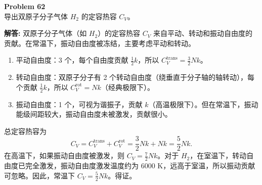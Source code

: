 \documentclass[12pt, a4paper, oneside]{ctexart}
\newenvironment{solution}{\par\noindent\textbf{解答:}\quad}{\par}
\begin{document}
\begin{mdframed}[backgroundcolor=gray!10, linewidth=0pt]
    \textbf{Problem 62} \\
    导出双原子分子气体 $H_2$ 的定容热容 $C_V$。
\end{mdframed}
\begin{solution}
    双原子分子气体（如 $H_2$）的定容热容 $C_V$ 来自平动、转动和振动自由度的贡献。在常温下，振动自由度被冻结，主要考虑平动和转动。
    \begin{enumerate}
        \item 平动自由度：3 个，每个自由度贡献 $\frac{1}{2} k$，所以 $C_V^{\text{trans}} = \frac{3}{2} N k$。
        \item 转动自由度：双原子分子有 2 个转动自由度（绕垂直于分子轴的轴转动），每个贡献 $\frac{1}{2} k$，所以 $C_V^{\text{rot}} = N k$（经典极限下）。
        \item 振动自由度：1 个，可视为谐振子，贡献 $k$（高温极限下）。但在常温下，振动能级间距较大，振动自由度未被激发，贡献很小。
    \end{enumerate}
    总定容热容为
    \[
    C_V = C_V^{\text{trans}} + C_V^{\text{rot}} = \frac{3}{2} N k + N k = \frac{5}{2} N k.
    \]
    在高温下，如果振动自由度被激发，则 $C_V = \frac{7}{2} N k$。对于 $H_2$，在室温下，转动自由度已完全激发，振动自由度激发温度约为 6000 K，远高于室温，所以振动贡献可忽略。因此，常温下 $C_V = \frac{5}{2} N k$。得证。
\end{solution}
\end{document}
